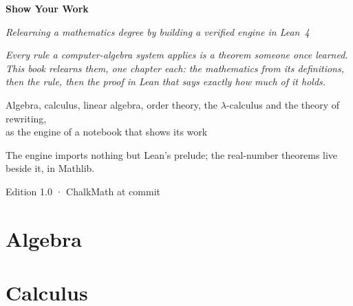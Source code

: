 \documentclass[12pt, a4paper, openright]{book}
\theoremstyle{thmstyle}
\theoremstyle{defstyle}
\begin{document}
\frontmatter

\begin{titlepage}
  \centering
  \vspace*{2cm}
  {\Huge\bfseries Show Your Work\par}
  \vspace{0.5cm}
  {\large\itshape Relearning a mathematics degree by building a verified engine in Lean~4\par}
  \vspace{3cm}
  \begin{tcolorbox}[width=0.75\textwidth, colback=gray!8, colframe=gray!50, arc=4pt, boxrule=0.6pt]
    \small\centering
    \textit{Every rule a computer-algebra system applies is a theorem someone once learned.\\
    This book relearns them, one chapter each: the mathematics from its definitions,\\
    then the rule, then the proof in Lean that says exactly how much of it holds.}
  \end{tcolorbox}
  \vfill
  {\large Algebra, calculus, linear algebra, order theory, the \(\lambda\)-calculus and the theory of rewriting,\\
  as the engine of a notebook that shows its work\par}
  \vspace{1cm}
  {\normalsize The engine imports nothing but Lean's prelude; the real-number theorems live beside it, in Mathlib.\par}
  \vspace{0.5cm}
  {\small\color{gray} Edition 1.0 · ChalkMath at commit \texttt{}\par}
\end{titlepage}


\tableofcontents

\mainmatter
\part{Algebra}






\part{Calculus}




\end{document}
